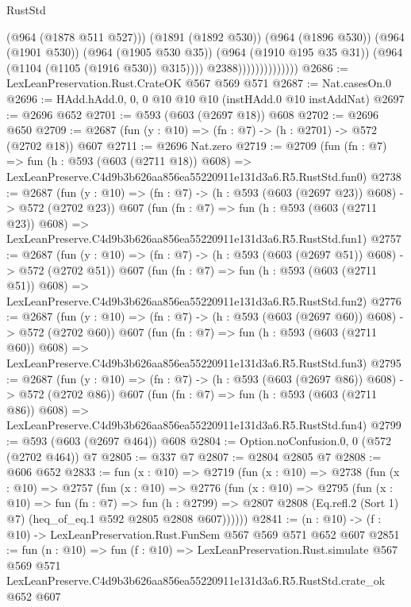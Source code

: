 \begin{lexlean}{RustStd}
\begin{coremodule}
                                      (@964 (@1878 @511 @527)))
                                    (@1891 (@1892 @530))
                                    (@964 (@1896 @530))
                                    (@964 (@1901 @530))
                                    (@964 (@1905 @530 @35))
                                    (@964 (@1910 @195 @35 @31))
                                    (@964 (@1104 (@1105 (@1916 @530)) @315))))
                                @2388))))))))))))))
@2686 := LexLeanPreservation.Rust.CrateOK @567 @569 @571
@2687 := Nat.casesOn.{0}
@2696 := HAdd.hAdd.{0, 0, 0} @10 @10 @10 (instHAdd.{0} @10 instAddNat)
@2697 := @2696 @652
@2701 := @593 (@603 (@2697 @18)) @608
@2702 := @2696 @650
@2709 := @2687 (fun (y : @10) => (fn : @7) -> (h : @2701) -> @572 (@2702 @18)) @607
@2711 := @2696 Nat.zero
@2719 := @2709
    (fun (fn : @7) =>
    fun (h : @593 (@603 (@2711 @18)) @608) =>
    LexLeanPreserve.C4d9b3b626aa856ea55220911e131d3a6.R5.RustStd.fun0)
@2738 := @2687
    (fun (y : @10) => (fn : @7) -> (h : @593 (@603 (@2697 @23)) @608) -> @572 (@2702 @23))
    @607
    (fun (fn : @7) =>
    fun (h : @593 (@603 (@2711 @23)) @608) =>
    LexLeanPreserve.C4d9b3b626aa856ea55220911e131d3a6.R5.RustStd.fun1)
@2757 := @2687
    (fun (y : @10) => (fn : @7) -> (h : @593 (@603 (@2697 @51)) @608) -> @572 (@2702 @51))
    @607
    (fun (fn : @7) =>
    fun (h : @593 (@603 (@2711 @51)) @608) =>
    LexLeanPreserve.C4d9b3b626aa856ea55220911e131d3a6.R5.RustStd.fun2)
@2776 := @2687
    (fun (y : @10) => (fn : @7) -> (h : @593 (@603 (@2697 @60)) @608) -> @572 (@2702 @60))
    @607
    (fun (fn : @7) =>
    fun (h : @593 (@603 (@2711 @60)) @608) =>
    LexLeanPreserve.C4d9b3b626aa856ea55220911e131d3a6.R5.RustStd.fun3)
@2795 := @2687
    (fun (y : @10) => (fn : @7) -> (h : @593 (@603 (@2697 @86)) @608) -> @572 (@2702 @86))
    @607
    (fun (fn : @7) =>
    fun (h : @593 (@603 (@2711 @86)) @608) =>
    LexLeanPreserve.C4d9b3b626aa856ea55220911e131d3a6.R5.RustStd.fun4)
@2799 := @593 (@603 (@2697 @464)) @608
@2804 := Option.noConfusion.{0, 0} (@572 (@2702 @464)) @7
@2805 := @337 @7
@2807 := @2804 @2805 @7
@2808 := @606 @652
@2833 := fun (x : @10) =>
  @2719
    (fun (x : @10) =>
    @2738
      (fun (x : @10) =>
      @2757
        (fun (x : @10) =>
        @2776
          (fun (x : @10) =>
          @2795
            (fun (x : @10) =>
            fun (fn : @7) =>
            fun (h : @2799) =>
            @2807 @2808 (Eq.refl.{2} (Sort 1) @7) (heq_of_eq.{1} @592 @2805 @2808 @607))))))
@2841 := (n : @10) -> (f : @10) -> LexLeanPreservation.Rust.FunSem @567 @569 @571 @652 @607
@2851 := fun (n : @10) =>
  fun (f : @10) =>
  LexLeanPreservation.Rust.simulate
    @567
    @569
    @571
    LexLeanPreserve.C4d9b3b626aa856ea55220911e131d3a6.R5.RustStd.crate_ok
    @652
    @607
\end{coremodule}
\end{lexlean}
